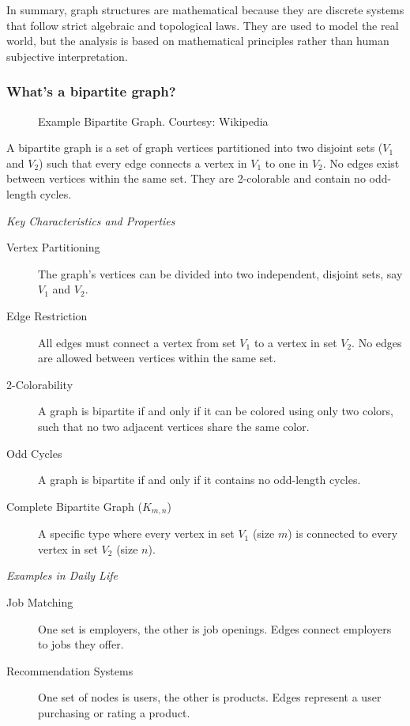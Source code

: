 \documentclass[11pt]{article}
\begin{document}
In summary, graph structures are mathematical because
they are discrete systems that follow strict algebraic
and topological laws. They are used to model the real
world, but the analysis is based on mathematical
principles rather than human subjective interpretation.
\subsubsection{What's a bipartite graph?}
\label{sec:org7d0e41f}

\begin{figure}
\centering
\color{white}
\def\svgwidth{0.7\textwidth}

\caption{Example Bipartite Graph. Courtesy: Wikipedia}
\label{fig:bipartite-graph}
\end{figure}

A bipartite graph is a set of graph vertices
partitioned into two disjoint sets (\(V_1\) and \(V_2\))
such that every edge connects a vertex in \(V_1\) to one
in \(V_2\).  No edges exist between vertices within the
same set.  They are 2-colorable and contain no
odd-length cycles.

\emph{Key Characteristics and Properties}
\begin{description}
\item[{Vertex Partitioning}] The graph's vertices can be
divided into two independent, disjoint sets, say
\(V_{1}\) and \(V_{2}\).
\item[{Edge Restriction}] All edges must connect a vertex
from set \(V_1\) to a vertex in set \(V_2\).  No edges
are allowed between vertices within the same set.
\item[{2-Colorability}] A graph is bipartite if and only if
it can be colored using only two colors, such that no
two adjacent vertices share the same color.
\item[{Odd Cycles}] A graph is bipartite if and only if it
contains no odd-length cycles.
\item[{Complete Bipartite Graph (\(K_{m,n}\))}] A specific
type where every vertex in set \(V_1\) (size \(m\)) is
connected to every vertex in set \(V_2\) (size \(n\)).
\end{description}


\emph{Examples in Daily Life}
\begin{description}
\item[{Job Matching}] One set is employers, the other is
job openings. Edges connect employers to jobs they
offer.
\item[{Recommendation Systems}] One set of nodes is users,
the other is products. Edges represent a user
purchasing or rating a product.
\end{description}
\end{document}
